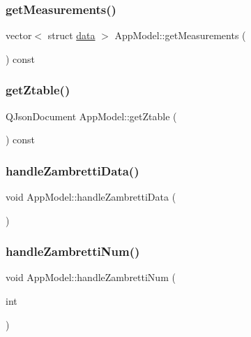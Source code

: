 \mbox{\label{class_app_model_aeb65a362d2a2875ed038dc1ae359a337}} 
\subsubsection{\texorpdfstring{get\+Measurements()}{getMeasurements()}}
{\footnotesize\ttfamily vector$<$ struct \hyperlink{structdata}{data} $>$ App\+Model\+::get\+Measurements (\begin{DoxyParamCaption}{ }\end{DoxyParamCaption}) const}

\mbox{\label{class_app_model_a1e221ad7947cc08e85078416afc5a593}} 
\subsubsection{\texorpdfstring{get\+Ztable()}{getZtable()}}
{\footnotesize\ttfamily Q\+Json\+Document App\+Model\+::get\+Ztable (\begin{DoxyParamCaption}{ }\end{DoxyParamCaption}) const}

\mbox{\label{class_app_model_a99a784aac19e82ccc6c0dd0509b4ea04}} 
\subsubsection{\texorpdfstring{handle\+Zambretti\+Data()}{handleZambrettiData()}}
{\footnotesize\ttfamily void App\+Model\+::handle\+Zambretti\+Data (\begin{DoxyParamCaption}{ }\end{DoxyParamCaption})}

\mbox{\label{class_app_model_a75d2b6e818885a77f1b1dd56fc3c9cd3}} 
\subsubsection{\texorpdfstring{handle\+Zambretti\+Num()}{handleZambrettiNum()}}
{\footnotesize\ttfamily void App\+Model\+::handle\+Zambretti\+Num (\begin{DoxyParamCaption}\item[{int}]{ }\end{DoxyParamCaption})}


